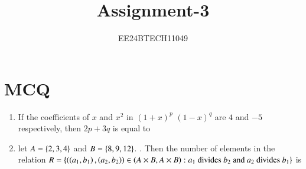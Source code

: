 \documentclass[journal]{IEEEtran}
\numberwithin{equation}{enumi}
\numberwithin{figure}{enumi}
\begin{document}


\title{Assignment-3}
\author{EE24BTECH11049}

{\let\newpage\relax\maketitle}

\section*{MCQ}
\begin{enumerate}

    \item 
    If the coefficients of $x$ and $x^2$ in $(1 + x)^p$ $(1 - x)^q$ are $4$ and $-5$ respectively, then $2p + 3q$ is equal to

    \hfill{}

    \begin{enumerate}
    \end{enumerate}

    \item 
    let $A = \left\{2, 3, 4\right\}$ and $B =  \left\{8, 9, 12\right\}$. . Then the number of elements in the relation $R = \left\{\left(\left(a_1, b_1\right), \left(a_2, b_2\right)\right) \in \left(A \times B, A \times B\right) : a_1 \text{ divides } b_2 \text{ and } a_2 \text{ divides } b_1\right\}$ is 

    \hfill{}

    \begin{enumerate}
    \end{enumerate}


\end{enumerate}
\end{document}
